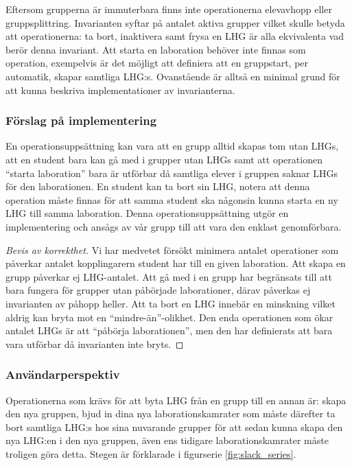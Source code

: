 Eftersom grupperna är immuterbara finns inte operationerna elevavhopp eller gruppsplittring. Invarianten syftar på antalet aktiva grupper vilket skulle betyda att operationerna: ta bort, inaktivera samt frysa en LHG är alla ekvivalenta vad berör denna invariant.  Att starta en laboration behöver inte finnas som operation, exempelvis är det möjligt att definiera att en gruppstart, per automatik, skapar samtliga LHG:s. Ovanstående är alltså en minimal grund för att kunna beskriva implementationer av invarianterna.

\subsubsection{Förslag på implementering}
En operationsuppsättning kan vara att en grupp alltid skapas tom utan LHGs, att en student bara kan gå med i grupper utan LHGs samt att operationen “starta laboration” bara är utförbar då samtliga elever i gruppen saknar LHGs för den laborationen. En student kan ta bort sin LHG, notera att denna operation måste finnas för att samma student ska någonsin kunna starta en ny LHG till samma laboration. Denna operationsuppsättning utgör en implementering och ansågs av vår grupp till att vara den enklast genomförbara.


\begin{proof}[Bevis av korrekthet]
  Vi har medvetet försökt minimera antalet operationer som påverkar antalet kopplingarern student har till en given laboration. Att skapa en grupp påverkar ej LHG-antalet. Att gå med i en grupp har begränsats till att bara fungera för grupper utan påbörjade laborationer, därav påverkas ej invarianten av påhopp heller. Att ta bort en LHG innebär en minskning vilket aldrig kan bryta mot en “mindre-än”-olikhet. Den enda operationen som ökar antalet LHGs är att “påbörja laborationen”, men den har definierats att bara vara utförbar då invarianten inte bryts. \qedhere
\end{proof}

\subsubsection{Användarperspektiv}
Operationerna som krävs för att byta LHG från en grupp till en annan är: skapa den nya gruppen, bjud in dina nya laborationskamrater som måste därefter ta bort samtliga LHG:s hos sina nuvarande grupper för att sedan kunna skapa den nya LHG:en i den nya gruppen, även ens tidigare laborationskamrater måste troligen göra detta. Stegen är förklarade i  figurserie \ref{fig:slack_series}.

